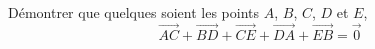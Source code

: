 
Démontrer que quelques soient les points $A$, $B$, $C$, $D$ et $E$, 
$$\overrightarrow{AC}+\overrightarrow{BD}+\overrightarrow{CE}+\overrightarrow{DA}+\overrightarrow{EB}=\overrightarrow{0}$$
